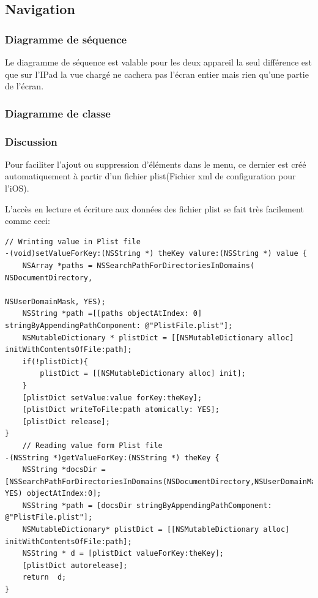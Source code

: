 	
	\subsection{Navigation}
		\subsubsection*{Diagramme de séquence}
			Le diagramme de séquence est valable pour les deux appareil la seul différence est que sur l'IPad la vue chargé  ne cachera pas l'écran entier mais rien qu'une partie de l'écran.
		\subsubsection*{Diagramme de classe}
		\subsubsection*{Discussion}
		Pour faciliter l'ajout ou suppression d'éléments dans le menu, ce dernier est créé automatiquement à partir  d'un fichier plist(Fichier xml de configuration pour l'iOS). 
			
		L'accès en lecture et écriture aux données des fichier plist se fait très facilement comme ceci:
	\lstset{
	    style = Xcode,
	    caption=Code d'ecriture et de lecture dans un fichier plist.,
	    breaklines=true,
	    frame=single
	}
	
	\begin{lstlisting}[name=R/W in plist, label=SampleCode]
	// Wrinting value in Plist file
-(void)setValueForKey:(NSString *) theKey valure:(NSString *) value {
    NSArray *paths = NSSearchPathForDirectoriesInDomains( NSDocumentDirectory,
                                                         NSUserDomainMask, YES); 
    NSString *path =[[paths objectAtIndex: 0] stringByAppendingPathComponent: @"PlistFile.plist"];
    NSMutableDictionary * plistDict = [[NSMutableDictionary alloc] initWithContentsOfFile:path];
    if(!plistDict){
        plistDict = [[NSMutableDictionary alloc] init];
    }
    [plistDict setValue:value forKey:theKey];
    [plistDict writeToFile:path atomically: YES];
    [plistDict release];
}
	// Reading value form Plist file
-(NSString *)getValueForKey:(NSString *) theKey {
    NSString *docsDir = [NSSearchPathForDirectoriesInDomains(NSDocumentDirectory,NSUserDomainMask, YES) objectAtIndex:0];
    NSString *path = [docsDir stringByAppendingPathComponent: @"PlistFile.plist"];
    NSMutableDictionary* plistDict = [[NSMutableDictionary alloc] initWithContentsOfFile:path];
    NSString * d = [plistDict valueForKey:theKey];
    [plistDict autorelease];
    return  d;
}
\end{lstlisting}


